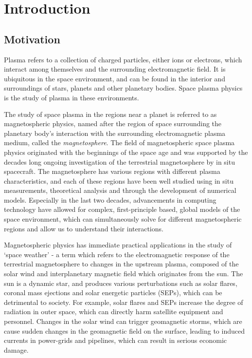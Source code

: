 \chapter{Introduction}

\section{Motivation}

Plasma refers to a collection of charged particles, either ions or electrons, which interact among themselves and the surrounding electromagnetic field. It is ubiquitous in the space environment, and can be found in the interior and surroundings of stars, planets and other planetary bodies. Space plasma physics is the study of plasma in these environments. 

The study of space plasma in the regions near a planet is referred to as magnetospheric physics, named after the region of space surrounding the planetary body's interaction with the surrounding electromagnetic plasma medium, called the \emph{magnetosphere}. The field of magnetospheric space plasma physics originated with the beginnings of the space age and was supported by the decades long ongoing investigation of the terrestrial magnetosphere by in situ spacecraft. The magnetosphere has various regions with different plasma characteristics, and each of these regions have been well studied using in situ measurements, theoretical analysis and through the development of numerical models. Especially in the last two decades, advancements in computing technology have allowed for complex, first-principle based, global models of the space environment, which can simultaneously solve for different magnetospheric regions and allow us to understand their interactions. 

Magnetospheric physics has immediate practical applications in the study of `space weather' - a term which refers to the electromagnetic response of the terrestrial magnetosphere to changes in the upstream plasma, composed of the solar wind and interplanetary magnetic field which originates from the sun. The sun is a dynamic star, and produces various perturbations such as solar flares, coronal mass ejections and solar energetic particles (SEPs), which can be detrimental to society. For example, solar flares and SEPs increase the degree of radiation in outer space, which can directly harm satellite equipment and personnel. Changes in the solar wind can trigger geomagnetic storms, which are cause sudden changes in the geomagnetic field on the surface, leading to induced currents in power-grids and pipelines, which can result in serious economic damage. 

